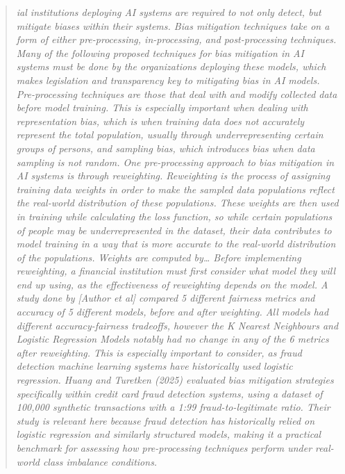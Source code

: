 \documentclass[conference]{IEEEtran}
\begin{document}
\begin{quote}
\textit{ial institutions deploying AI systems are required to not only detect, but mitigate biases within their systems. Bias mitigation techniques take on a form of either pre-processing, in-processing, and post-processing techniques. Many of the following proposed techniques for bias mitigation in AI systems must be done by the organizations deploying these models, which makes legislation and transparency key to mitigating bias in AI models. Pre-processing techniques are those that deal with and modify collected data before model training. This is especially important when dealing with representation bias, which is when training data does not accurately represent the total population, usually through underrepresenting certain groups of persons, and sampling bias, which introduces bias when data sampling is not random. One pre-processing approach to bias mitigation in AI systems is through reweighting. Reweighting is the process of assigning training data weights in order to make the sampled data populations reflect the real-world distribution of these populations. These weights are then used in training while calculating the loss function, so while certain populations of people may be underrepresented in the dataset, their data contributes to model training in a way that is more accurate to the real-world distribution of the populations. Weights are computed by… Before implementing reweighting, a financial institution must first consider what model they will end up using, as the effectiveness of reweighting depends on the model. A study done by [Author et al] compared 5 different fairness metrics and accuracy of 5 different models, before and after weighting. All models had different accuracy-fairness tradeoffs, however the K Nearest Neighbours and Logistic Regression Models notably had no change in any of the 6 metrics after reweighting. This is especially important to consider, as fraud detection machine learning systems have historically used logistic regression. Huang and Turetken (2025) evaluated bias mitigation strategies specifically within credit card fraud detection systems, using a dataset of 100,000 synthetic transactions with a 1:99 fraud-to-legitimate ratio. Their study is relevant here because fraud detection has historically relied on logistic regression and similarly structured models, making it a practical benchmark for assessing how pre-processing techniques perform under real-world class imbalance conditions.}
\end{quote}
\end{document}
